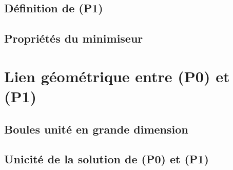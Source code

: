 \subsection{Définition de (P1)}
\subsection{Propriétés du minimiseur}

\section{Lien géométrique entre (P0) et (P1)}
\subsection{Boules unité en grande dimension}
\subsection{Unicité de la solution de (P0) et (P1)}


